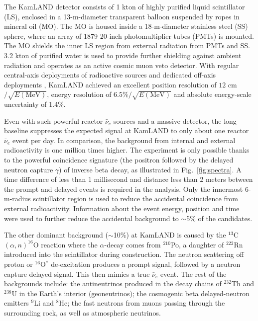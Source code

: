 The KamLAND detector consists of 1 kton of highly purified liquid scintillator (LS), enclosed in a 13-m-diameter transparent balloon suspended by ropes in mineral oil (MO). 
The MO is housed inside a 18-m-diameter stainless steel (SS) sphere, where an array of 1879 20-inch photomultiplier tubes (PMTs) is mounted. 
The MO shields the inner LS region from external radiation from PMTs and SS. 
3.2 kton of purified water is used to provide further shielding against ambient radiation and operates as an active cosmic muon veto detector. 
With regular central-axis deployments of radioactive sources and dedicated off-axis deployments \cite{KamLAND-4pi}, KamLAND achieved an excellent position resolution of $12$ cm$/\sqrt{E(\textrm{MeV})}$, energy resolution of $6.5\%/\sqrt{E(\textrm{MeV})}$ and absolute energy-scale uncertainty of 1.4\%.

Even with such powerful reactor $\bar\nu_e$ sources and a massive detector, the long baseline suppresses the expected signal at KamLAND to only about one reactor $\bar\nu_e$ event per day. 
In comparison, the background from internal and external radioactivity is one million times higher. 
The experiment is only possible thanks to the powerful coincidence signature (the positron followed by the delayed neutron capture $\gamma$) of inverse beta decay, as illustrated in Fig.~\ref{fig:spectra}. 
A time difference of less than 1 millisecond and distance less than 2 meters between the prompt and delayed events is required in the analysis. 
Only the innermost 6-m-radius scintillator region is used to reduce the accidental coincidence from external radioactivity. 
Information about the event energy, position and time were used to further reduce the accidental background to $\sim$5\% of the candidates.

The other dominant background ($\sim$10\%) at KamLAND is caused by the $^{13}$C$(\alpha,n)^{16}$O reaction where the $\alpha$-decay comes from $^{210}$Po, a daughter of $^{222}$Rn introduced into the scintillator during construction. 
The neutron scattering off proton or $^{16}$O$^*$ de-excitation produces a prompt signal, followed by a neutron capture delayed signal. This then mimics a true $\bar\nu_e$ event. The rest of the backgrounds include: the antineutrinos produced in the decay chains of $^{232}$Th and $^{238}$U in the Earth's interior (geoneutrinos); the cosmogenic beta delayed-neutron emitters $^{9}$Li and $^{8}$He;  the fast neutrons from muons passing through the surrounding rock, as well as atmospheric neutrinos. 

